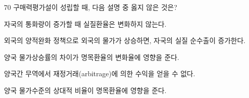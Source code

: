 \begin{question}{70}
구매력평가설이 성립할 때, 다음 설명 중 옳지 않은 것은?
\begin{choices}
  \item 자국의 통화량이 증가할 때 실질환율은 변화하지 않는다.
  \item 외국의 양적완화 정책으로 외국의 물가가 상승하면, 자국의 실질 순수출이 증가한다.
  \item 양국 물가상승률의 차이가 명목환율의 변화율에 영향을 준다.
  \item 양국간 무역에서 재정거래(arbitrage)에 의한 수익을 얻을 수 없다.
  \item 양국 물가수준의 상대적 비율이 명목환율에 영향을 준다.
\end{choices}
\end{question}
